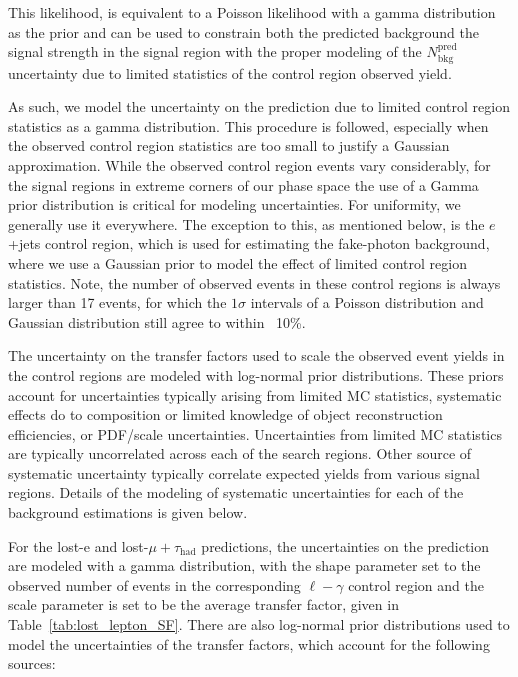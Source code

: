 This likelihood, is equivalent to a Poisson likelihood with a gamma distribution
as the prior and can be used to constrain both the predicted background the 
signal strength in the signal region with the proper modeling of the $N^{\mathrm{pred}}_{\mathrm{bkg}}$ 
uncertainty due to limited statistics of the control region observed yield.

As such, we model the uncertainty on the prediction due to limited 
control region statistics as a gamma distribution.  This procedure is followed, especially when the 
observed control region statistics are too small to justify a Gaussian 
approximation.  While the observed control region events vary considerably, 
for the signal regions in extreme corners of our phase space the use of a 
Gamma prior distribution is critical for modeling uncertainties.  For uniformity, 
we generally use it everywhere.  The exception to this, as mentioned below, is 
the $e$+jets control region, 
which is used for estimating the fake-photon background, where we use a Gaussian prior 
to model the effect of limited control region statistics.  Note, the number of 
observed events in these control regions is always larger than 17 events, for 
which the $1\sigma$ intervals of a Poisson distribution and Gaussian distribution
still agree to within ~10\%.  

The uncertainty on the transfer factors used to scale the observed event yields 
in the control regions are modeled with log-normal prior
distributions.  These priors account for uncertainties typically arising 
from limited MC statistics, systematic effects do to composition or limited knowledge 
of object reconstruction efficiencies, or PDF/scale uncertainties.  Uncertainties 
from limited MC statistics are typically uncorrelated across each of the 
search regions.  Other source of systematic uncertainty typically correlate 
expected yields from various signal regions.  Details of the modeling of 
systematic uncertainties for each of the background estimations is given below. 

For the lost-e and lost-$\mu+\tau_{\mathrm{had}}$ predictions, the uncertainties
on the prediction are modeled with a gamma distribution, with the 
shape parameter set to the observed number of events in the corresponding
$\ell-\gamma$ control region and the scale parameter is set to be the
average transfer factor, given in Table~\ref{tab:lost_lepton_SF}.  There 
are also log-normal prior distributions used to model the uncertainties
of the transfer factors, which account for the following sources:

